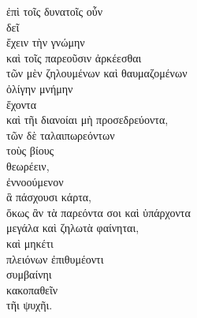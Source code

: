 
{\large
\begin{greek}
\noindent ἐπὶ τοῖς δυνατοῖς οὖν \\
δεῖ \\
\tabto{2em} ἔχειν τὴν γνώμην \\
\tabto{2em} καὶ τοῖς παρεοῦσιν ἀρκέεσθαι \\
\tabto{4em} τῶν μὲν ζηλουμένων καὶ θαυμαζομένων \\
\tabto{2em} ὀλίγην μνήμην \\
ἔχοντα\\
καὶ τῆι διανοίαι μὴ προσεδρεύοντα, \\
\tabto{4em} τῶν δὲ ταλαιπωρεόντων \\
\tabto{2em} τοὺς βίους \\
θεωρέειν, \\
ἐννοούμενον \\
\tabto{2em} ἃ πάσχουσι κάρτα, \\
ὅκως ἂν τὰ παρεόντα σοι καὶ ὑπάρχοντα \\
\tabto{2em} μεγάλα καὶ ζηλωτὰ φαίνηται, \\
\tabto{2em} καὶ μηκέτι \\
\tabto{2em} πλειόνων ἐπιθυμέοντι \\
\tabto{2em} συμβαίνηι \\
\tabto{4em} κακοπαθεῖν \\
\tabto{6em} τῆι ψυχῆι.\\

\end{greek}
}

